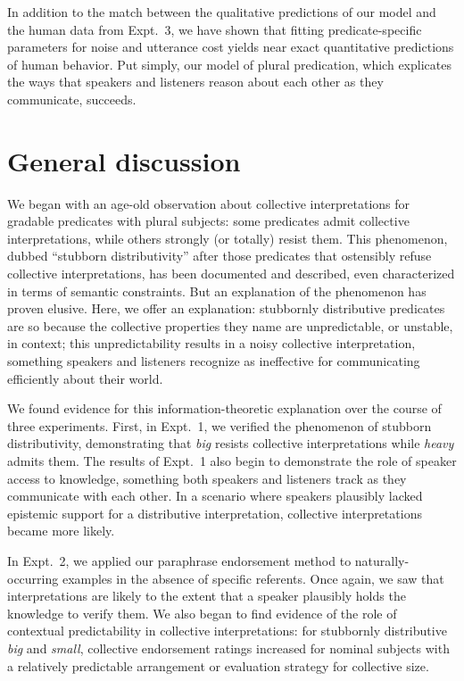 \documentclass[linguex]{sp}
\begin{document}
In addition to the match between the qualitative predictions of our model and the human data from Expt.~3, we have shown that fitting predicate-specific parameters for noise and utterance cost yields near exact quantitative predictions of human behavior. Put simply, our model of plural predication, which explicates the ways that speakers and listeners reason about each other as they communicate, succeeds. %


\section{General discussion}

We began with an age-old observation about collective interpretations for gradable predicates with plural subjects: some predicates admit collective interpretations, while others strongly (or totally) resist them. This phenomenon, dubbed ``stubborn distributivity'' after those predicates that ostensibly refuse collective interpretations, has been documented and described, even characterized in terms of semantic constraints. But an explanation of the phenomenon has proven elusive. Here, we offer an explanation: stubbornly distributive predicates are so because the collective properties they name are unpredictable, or unstable, in context; this unpredictability results in a noisy collective interpretation, something speakers and listeners recognize as ineffective for communicating efficiently about their world.

We found evidence for this information-theoretic explanation over the course of three experiments. First, in Expt.~1, we verified the phenomenon of stubborn distributivity, demonstrating that \emph{big} resists collective interpretations while \emph{heavy} admits them. The results of Expt.~1 also begin to demonstrate the role of speaker access to knowledge, something both speakers and listeners track as they communicate with each other. In a scenario where speakers plausibly lacked epistemic support for a distributive interpretation, collective interpretations became more likely.

In Expt.~2, we applied our paraphrase endorsement method to naturally-occurring examples in the absence of specific referents. Once again, we saw that interpretations are likely to the extent that a speaker plausibly holds the knowledge to verify them. We also began to find evidence of the role of contextual predictability in collective interpretations: for stubbornly distributive \emph{big} and \emph{small}, collective endorsement ratings increased for nominal subjects with a relatively predictable arrangement or evaluation strategy for collective size.
\end{document}
